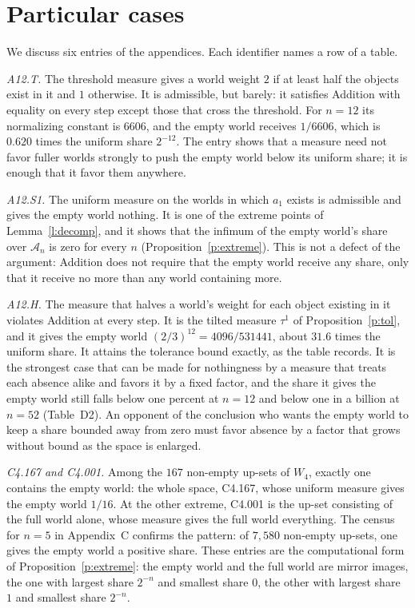 \documentclass{situationist-preprint}
\begin{document}
\section{Particular cases}\label{s:cases}

We discuss six entries of the appendices. Each identifier names a row of a table.

\emph{A12.T.} The threshold measure gives a world weight $2$ if at least half the objects exist in it and $1$ otherwise. It is admissible, but barely: it satisfies Addition with equality on every step except those that cross the threshold. For $n = 12$ its normalizing constant is $6606$, and the empty world receives $1/6606$, which is $0.620$ times the uniform share $2^{-12}$. The entry shows that a measure need not favor fuller worlds strongly to push the empty world below its uniform share; it is enough that it favor them anywhere.

\emph{A12.S1.} The uniform measure on the worlds in which $a_1$ exists is admissible and gives the empty world nothing. It is one of the extreme points of Lemma~\ref{l:decomp}, and it shows that the infimum of the empty world's share over $\mathcal{A}_n$ is zero for every $n$ (Proposition~\ref{p:extreme}). This is not a defect of the argument: Addition does not require that the empty world receive any share, only that it receive no more than any world containing more.

\emph{A12.H.} The measure that halves a world's weight for each object existing in it violates Addition at every step. It is the tilted measure $\tau^{1}$ of Proposition~\ref{p:tol}, and it gives the empty world $(2/3)^{12} = 4096/531441$, about $31.6$ times the uniform share. It attains the tolerance bound exactly, as the table records. It is the strongest case that can be made for nothingness by a measure that treats each absence alike and favors it by a fixed factor, and the share it gives the empty world still falls below one percent at $n = 12$ and below one in a billion at $n = 52$ (Table~D2). An opponent of the conclusion who wants the empty world to keep a share bounded away from zero must favor absence by a factor that grows without bound as the space is enlarged.

\emph{C4.167 and C4.001.} Among the $167$ non-empty up-sets of $W_4$, exactly one contains the empty world: the whole space, C4.167, whose uniform measure gives the empty world $1/16$. At the other extreme, C4.001 is the up-set consisting of the full world alone, whose measure gives the full world everything. The census for $n = 5$ in Appendix~C confirms the pattern: of $7{,}580$ non-empty up-sets, one gives the empty world a positive share. These entries are the computational form of Proposition~\ref{p:extreme}: the empty world and the full world are mirror images, the one with largest share $2^{-n}$ and smallest share $0$, the other with largest share $1$ and smallest share $2^{-n}$.
\end{document}
